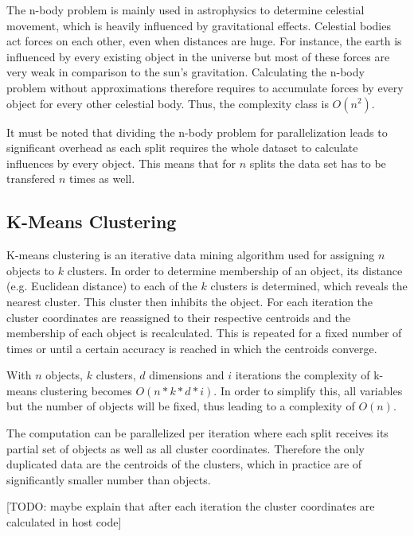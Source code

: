 The n-body problem is mainly used in astrophysics to determine celestial movement, which is heavily influenced by gravitational effects. Celestial bodies act forces on each other, even when distances are huge. For instance, the earth is influenced by every existing object in the universe but most of these forces are very weak in comparison to the sun's gravitation. Calculating the n-body problem without approximations therefore requires to accumulate forces by every object for every other celestial body. Thus, the complexity class is $O(n^2)$.

It must be noted that dividing the n-body problem for parallelization leads to significant overhead as each split requires the whole dataset to calculate influences by every object. This means that for $n$ splits the data set has to be transfered $n$ times as well.

\subsection*{K-Means Clustering}

K-means clustering is an iterative data mining algorithm used for assigning $n$ objects to $k$ clusters. In order to determine membership of an object, its distance (e.g. Euclidean distance) to each of the $k$ clusters is determined, which reveals the nearest cluster. This cluster then inhibits the object. For each iteration the cluster coordinates are reassigned to their respective centroids and the membership of each object is recalculated. This is repeated for a fixed number of times or until a certain accuracy is reached in which the centroids converge.

With $n$ objects, $k$ clusters, $d$ dimensions and $i$ iterations the complexity of k-means clustering becomes $O(n*k*d*i)$. In order to simplify this, all variables but the number of objects will be fixed, thus leading to a complexity of $O(n)$.

The computation can be parallelized per iteration where each split receives its partial set of objects as well as all cluster coordinates. Therefore the only duplicated data are the centroids of the clusters, which in practice are of significantly smaller number than objects.

[TODO: maybe explain that after each iteration the cluster coordinates are calculated in host code]

